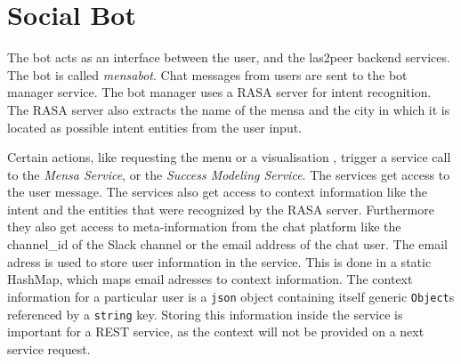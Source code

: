 \section{Social Bot}

The bot acts as an interface between the user, and the las2peer backend services. The bot is called \emph{mensabot}.
Chat messages from users are sent to the bot manager service. 
The bot manager uses a RASA server for intent recognition. 
The RASA server also extracts the name of the mensa and the city in which it is located as possible intent entities from the user input.

Certain actions, like requesting the menu or a visualisation , trigger a service call to the \emph{Mensa Service}, or the \emph{Success Modeling Service}.
The services get access to the user message.  
The services also get access to context information like the intent and the entities that were recognized by the RASA server.
Furthermore they also get access to meta-information from the chat platform like the channel\_id of the Slack channel or the email address of the chat user. 
The email adress is used to store user information in the service. This is done in a static HashMap, which maps email adresses to context information. The context information for a particular user is a \texttt{json} object containing itself generic \texttt{Object}s referenced by a \texttt{string} key. 
Storing this information inside the service is important for a REST service, as the context will not be provided on a next service request.

